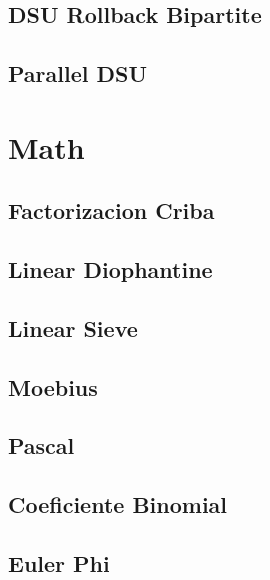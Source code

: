 \subsection{   DSU Rollback Bipartite}
\raggedbottom
\hrulefill
\subsection{   Parallel DSU}
\raggedbottom
\hrulefill

\section{Math}
\subsection{	Factorizacion Criba}
\raggedbottom
\hrulefill
\subsection{	Linear Diophantine}
\raggedbottom
\hrulefill
\subsection{	Linear Sieve}
\raggedbottom
\hrulefill
\subsection{	Moebius}
\raggedbottom
\hrulefill
\subsection{	Pascal}
\raggedbottom
\hrulefill
\subsection{	Coeficiente Binomial}
\raggedbottom
\hrulefill
\subsection{	Euler Phi}
\raggedbottom
\hrulefill
